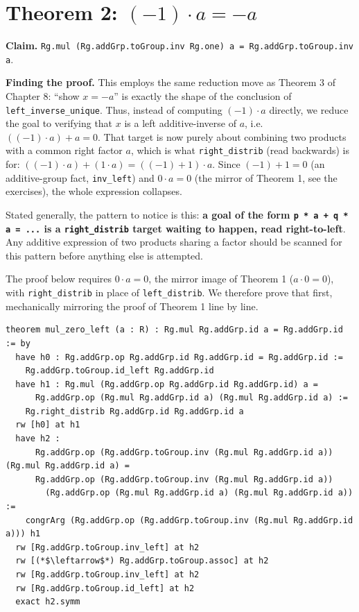 \section{\texorpdfstring{Theorem 2: \((-1) \cdot a = -a\)}{Theorem 2: (-1) \textbackslash cdot a = -a}}\label{sec:10-ring-theorems:03-theorem-2:1}

\textbf{Claim.} \texttt{Rg.mul (Rg.addGrp.toGroup.inv Rg.one) a = Rg.addGrp.toGroup.inv a}.

\textbf{Finding the proof.} This employs the same reduction move as Theorem 3 of Chapter 8: ``show \(x = -a\)'' is exactly the shape of the conclusion of \texttt{left\_\allowbreak{}inverse\_\allowbreak{}unique}. Thus, instead of computing \((-1)\cdot a\) directly, we reduce the goal to verifying that \(x\) is a left additive-inverse of \(a\), i.e.~\(((-1)\cdot a) + a = 0\). That target is now purely about combining two products with a common right factor \(a\), which is what \texttt{right\_\allowbreak{}distrib} (read backwards) is for: \(((-1)\cdot a) + (1 \cdot a) = ((-1) + 1)\cdot a\). Since \((-1) + 1 = 0\) (an additive-group fact, \texttt{inv\_\allowbreak{}left}) and \(0 \cdot a = 0\) (the mirror of Theorem 1, see the exercises), the whole expression collapses.

Stated generally, the pattern to notice is this: \textbf{a goal of the form \texttt{p * a + q * a = ...} is a \texttt{right\_\allowbreak{}distrib} target waiting to happen, read right-to-left}. Any additive expression of two products sharing a factor should be scanned for this pattern before anything else is attempted.

The proof below requires \(0\cdot a = 0\), the mirror image of Theorem 1 (\(a\cdot 0 = 0\)), with \texttt{right\_\allowbreak{}distrib} in place of \texttt{left\_\allowbreak{}distrib}. We therefore prove that first, mechanically mirroring the proof of Theorem 1 line by line.

\begin{lstlisting}
theorem mul_zero_left (a : R) : Rg.mul Rg.addGrp.id a = Rg.addGrp.id := by
  have h0 : Rg.addGrp.op Rg.addGrp.id Rg.addGrp.id = Rg.addGrp.id :=
    Rg.addGrp.toGroup.id_left Rg.addGrp.id
  have h1 : Rg.mul (Rg.addGrp.op Rg.addGrp.id Rg.addGrp.id) a =
      Rg.addGrp.op (Rg.mul Rg.addGrp.id a) (Rg.mul Rg.addGrp.id a) :=
    Rg.right_distrib Rg.addGrp.id Rg.addGrp.id a
  rw [h0] at h1
  have h2 :
      Rg.addGrp.op (Rg.addGrp.toGroup.inv (Rg.mul Rg.addGrp.id a)) (Rg.mul Rg.addGrp.id a) =
      Rg.addGrp.op (Rg.addGrp.toGroup.inv (Rg.mul Rg.addGrp.id a))
        (Rg.addGrp.op (Rg.mul Rg.addGrp.id a) (Rg.mul Rg.addGrp.id a)) :=
    congrArg (Rg.addGrp.op (Rg.addGrp.toGroup.inv (Rg.mul Rg.addGrp.id a))) h1
  rw [Rg.addGrp.toGroup.inv_left] at h2
  rw [(*$\leftarrow$*) Rg.addGrp.toGroup.assoc] at h2
  rw [Rg.addGrp.toGroup.inv_left] at h2
  rw [Rg.addGrp.toGroup.id_left] at h2
  exact h2.symm
\end{lstlisting}

